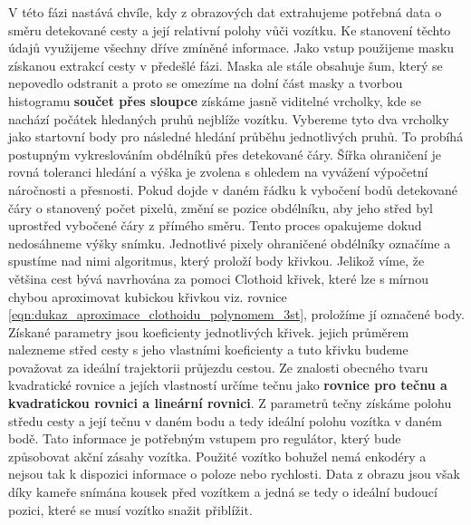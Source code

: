\documentclass[czech, bc, kky, he, iso690alph]{fasthesis}
\begin{document}
            	
                V této fázi nastává chvíle, kdy z obrazových dat extrahujeme potřebná data o směru detekované cesty a její relativní polohy vůči vozítku. Ke stanovení těchto údajů využijeme všechny dříve zmíněné informace. Jako vstup použijeme masku získanou extrakcí cesty v předešlé fázi. Maska ale stále obsahuje šum, který se nepovedlo odstranit a proto se omezíme na dolní část masky a tvorbou histogramu \textbf{součet přes sloupce} získáme jasně viditelné vrcholky, kde se nachází počátek hledaných pruhů nejblíže vozítku. Vybereme tyto dva vrcholky jako startovní body pro následné hledání průběhu jednotlivých pruhů. To probíhá postupným vykreslováním obdélníků přes detekované čáry. Šířka ohraničení je rovná toleranci hledání a výška je zvolena s ohledem na vyvážení výpočetní náročnosti a přesnosti. Pokud dojde v daném řádku k vybočení bodů detekované čáry o stanovený počet pixelů, změní se pozice obdélníku, aby jeho střed byl uprostřed vybočené čáry z přímého směru. Tento proces opakujeme dokud nedosáhneme výšky snímku. Jednotlivé pixely ohraničené obdélníky označíme a spustíme nad nimi algoritmus, který proloží body křivkou. Jelikož víme, že většina cest bývá navrhována za pomoci Clothoid křivek, které lze s mírnou chybou aproximovat kubickou křivkou viz. rovnice \ref{eqn:dukaz_aproximace_clothoidu_polynomem_3st}, proložíme jí označené body. Získané parametry jsou koeficienty jednotlivých křivek. jejich průměrem nalezneme střed cesty s jeho vlastními koeficienty a tuto křivku budeme považovat za ideální trajektorii průjezdu cestou. Ze znalosti obecného tvaru kvadratické rovnice a jejích vlastností určíme tečnu jako \textbf{rovnice pro tečnu a kvadratickou rovnici a lineární rovnici}. Z parametrů tečny získáme polohu středu cesty a její tečnu v daném bodu a tedy ideální polohu vozítka v daném bodě. Tato informace je potřebným vstupem pro regulátor, který bude způsobovat akční zásahy vozítka. Použité vozítko bohužel nemá enkodéry a nejsou tak k dispozici informace o poloze nebo rychlosti. Data z obrazu jsou však díky kameře snímána kousek před vozítkem a jedná se tedy o ideální budoucí pozici, které se musí vozítko snažit přiblížit.
\end{document}
